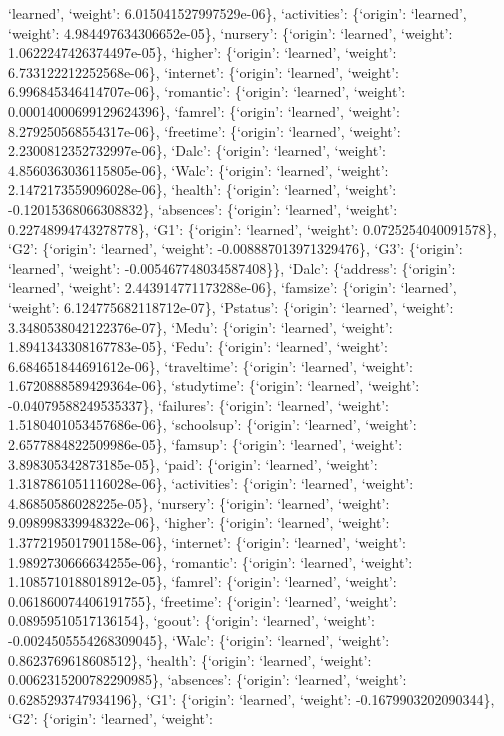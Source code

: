 \documentclass[
]{article}
\begin{document}
`learned', `weight': 6.015041527997529e-06\}, `activities': \{`origin':
`learned', `weight': 4.984497634306652e-05\}, `nursery': \{`origin':
`learned', `weight': 1.0622247426374497e-05\}, `higher': \{`origin':
`learned', `weight': 6.733122212252568e-06\}, `internet': \{`origin':
`learned', `weight': 6.996845346414707e-06\}, `romantic': \{`origin':
`learned', `weight': 0.00014000699129624396\}, `famrel': \{`origin':
`learned', `weight': 8.279250568554317e-06\}, `freetime': \{`origin':
`learned', `weight': 2.2300812352732997e-06\}, `Dalc': \{`origin':
`learned', `weight': 4.8560363036115805e-06\}, `Walc': \{`origin':
`learned', `weight': 2.1472173559096028e-06\}, `health': \{`origin':
`learned', `weight': -0.12015368066308832\}, `absences': \{`origin':
`learned', `weight': 0.22748994743278778\}, `G1': \{`origin': `learned',
`weight': 0.0725254040091578\}, `G2': \{`origin': `learned', `weight':
-0.008887013971329476\}, `G3': \{`origin': `learned', `weight':
-0.005467748034587408\}\}, `Dalc': \{`address': \{`origin': `learned',
`weight': 2.443914771173288e-06\}, `famsize': \{`origin': `learned',
`weight': 6.124775682118712e-07\}, `Pstatus': \{`origin': `learned',
`weight': 3.3480538042122376e-07\}, `Medu': \{`origin': `learned',
`weight': 1.8941343308167783e-05\}, `Fedu': \{`origin': `learned',
`weight': 6.684651844691612e-06\}, `traveltime': \{`origin': `learned',
`weight': 1.6720888589429364e-06\}, `studytime': \{`origin': `learned',
`weight': -0.04079588249535337\}, `failures': \{`origin': `learned',
`weight': 1.5180401053457686e-06\}, `schoolsup': \{`origin': `learned',
`weight': 2.6577884822509986e-05\}, `famsup': \{`origin': `learned',
`weight': 3.898305342873185e-05\}, `paid': \{`origin': `learned',
`weight': 1.3187861051116028e-06\}, `activities': \{`origin': `learned',
`weight': 4.86850586028225e-05\}, `nursery': \{`origin': `learned',
`weight': 9.098998339948322e-06\}, `higher': \{`origin': `learned',
`weight': 1.3772195017901158e-06\}, `internet': \{`origin': `learned',
`weight': 1.9892730666634255e-06\}, `romantic': \{`origin': `learned',
`weight': 1.1085710188018912e-05\}, `famrel': \{`origin': `learned',
`weight': 0.061860074406191755\}, `freetime': \{`origin': `learned',
`weight': 0.08959510517136154\}, `goout': \{`origin': `learned',
`weight': -0.0024505554268309045\}, `Walc': \{`origin': `learned',
`weight': 0.8623769618608512\}, `health': \{`origin': `learned',
`weight': 0.0062315200782290985\}, `absences': \{`origin': `learned',
`weight': 0.6285293747934196\}, `G1': \{`origin': `learned', `weight':
-0.1679903202090344\}, `G2': \{`origin': `learned', `weight':
\end{document}
